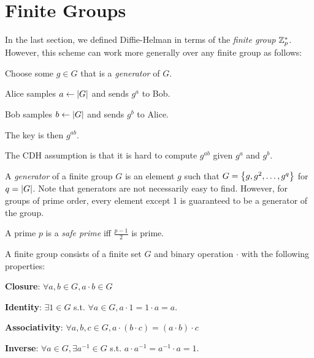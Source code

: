 \section{Finite Groups}
In the last section, we defined Diffie-Helman in terms of the \emph{finite group} $\mathbb{Z}_p^*$. However, this scheme can work more generally over any finite group as follows:

\begin{compactenum}
	\item Choose some $g \in G$ that is a \emph{generator} of $G$.
	\item Alice samples $a \gets \left| G \right|$ and sends $g^a$ to Bob.
	\item Bob samples $b \gets \left| G \right|$ and sends $g^b$ to Alice.
	\item The key is then $g^{ab}$.
\end{compactenum}

The CDH assumption is that it is hard to compute $g^{ab}$ given $g^a$ and $g^b$.

\begin{definition}
	A \emph{generator} of a finite group $G$ is an element $g$ such that $G = \left\{ g, g^2, \ldots, g^q \right\}$ for $q = \left| G \right|$. Note that generators are not necessarily easy to find. However, for groups of prime order, every element except 1 is guaranteed to be a generator of the group.
\end{definition}

\begin{definition}
	A prime $p$ is a \emph{safe prime} iff $\tfrac{p-1}{2}$ is prime.
\end{definition}

\begin{definition}
	A finite group consists of a finite set $G$ and binary operation $\cdot$ with the following properties:
	\begin{compactenum}
		\item \textbf{Closure}: $\forall a, b \in G, a \cdot b \in G$
		\item \textbf{Identity}: $\exists 1 \in G$  s.t. $\forall a \in G, a\cdot 1 = 1\cdot a = a$.
		\item \textbf{Associativity}: $\forall a, b, c \in G, a\cdot (b \cdot c) = (a \cdot b) \cdot c$
		\item \textbf{Inverse}: $\forall a \in G, \exists a^{-1} \in G$ s.t. $a\cdot a^{-1} = a^{-1}\cdot a = 1$.
	\end{compactenum}
\end{definition}

